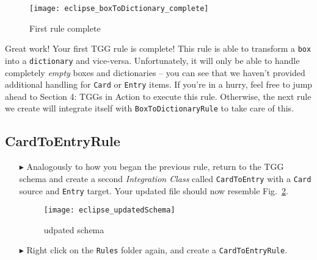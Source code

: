 \begin{figure}[htbp]
\begin{center}
  \texttt{[image: eclipse\_boxToDictionary\_complete]}
  \caption{First rule complete}
  \label{fig:allReferences}
\end{center}
\end{figure}


Great work! Your first TGG rule is complete! This rule is able to transform a \texttt{box} into a \texttt{dictionary} and vice-versa. Unfortunately, it will
only be able to handle completely \emph{empty} boxes and dictionaries -- you can see that we haven't provided additional handling for \texttt{Card} or
\texttt{Entry} items. If you're in a hurry, feel free to jump ahead to Section 4: TGGs in Action to execute this rule. Otherwise, the next rule we create will
integrate itself with \texttt{BoxToDictionaryRule} to take care of this.


\subsection{CardToEntryRule}

\begin{itemize} 

\item[$\blacktriangleright$] Analogously to how you began the previous rule, return to the TGG schema and create a second \emph{Integration Class} called
\texttt{CardToEntry} with a \texttt{Card} source and \texttt{Entry} target. Your updated file should now resemble Fig.~\ref{fig:updatedSchema}.

\vspace{0.5cm}

\begin{figure}[htbp]
\begin{center}
  \texttt{[image: eclipse\_updatedSchema]}
  \caption{udpated schema}
  \label{fig:updatedSchema}
\end{center}
\end{figure}

\item[$\blacktriangleright$] Right click on the \texttt{Rules} folder again, and create a \texttt{CardToEntryRule}.

\end{itemize}

